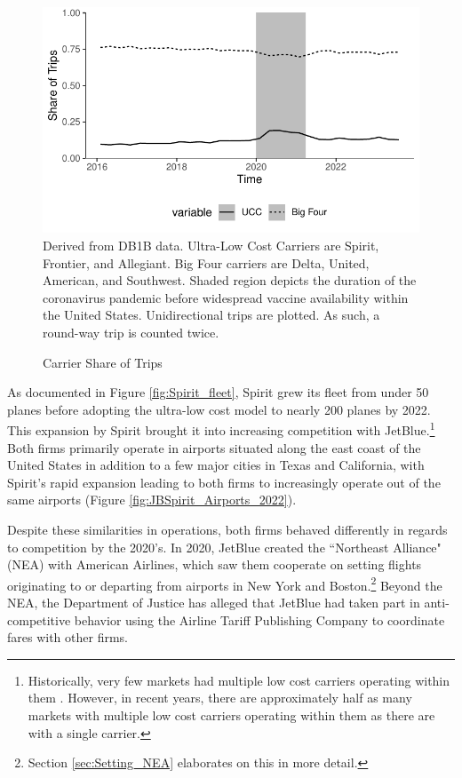 \documentclass{article}
\begin{document}
    	\begin{figure}
		\caption{Carrier Share of Trips}
		\label{fig:ULCC_Trips}
		\includegraphics[width = \linewidth]{Carrier_Share}
		\footnotesize{Derived from DB1B data. Ultra-Low Cost Carriers are Spirit, Frontier, and Allegiant. Big Four carriers are Delta, United, American, and Southwest. Shaded region depicts the duration of the coronavirus pandemic before widespread vaccine availability within the United States. Unidirectional trips are plotted. As such, a round-way trip is counted twice.}
	\end{figure}
	
	 As documented in Figure \ref{fig:Spirit_fleet}, Spirit grew its fleet from under 50 planes before adopting the ultra-low cost model to nearly 200 planes by 2022. This expansion by Spirit brought it into increasing competition with JetBlue.\footnote{Historically, very few markets had multiple low cost carriers operating within them \citep{kwoka_fringe_2016, ciliberto_market_2021}. However, in recent years, there are approximately half as many markets with multiple low cost carriers operating within them as there are with a single carrier.} Both firms primarily operate in airports situated along the east coast of the United States in addition to a few major cities in Texas and California, with Spirit's rapid expansion leading to both firms to increasingly operate out of the same airports (Figure \ref{fig:JBSpirit_Airports_2022}).
	
	Despite these similarities in operations, both firms behaved differently in regards to competition by the 2020's.  In 2020, JetBlue created the ``Northeast Alliance" (NEA) with American Airlines, which saw them cooperate on setting flights originating to or departing from airports in New York and Boston.\footnote{Section \ref{sec:Setting_NEA} elaborates on this in more detail.} Beyond the NEA, the Department of Justice has alleged that JetBlue had taken part in anti-competitive behavior using the Airline Tariff Publishing Company to coordinate fares with other firms. 
	
\end{document}
